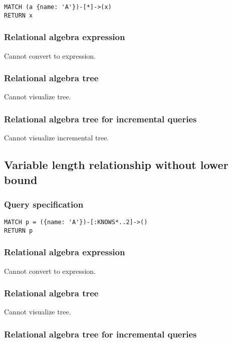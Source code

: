 \begin{lstlisting}
MATCH (a {name: 'A'})-[*]->(x)
RETURN x
\end{lstlisting}

\subsubsection*{Relational algebra expression}

Cannot convert to expression.

\subsubsection*{Relational algebra tree}

Cannot visualize tree.

\subsubsection*{Relational algebra tree for incremental queries}

Cannot visualize incremental tree.

\subsection{Variable length relationship without lower bound}

\subsubsection*{Query specification}

\begin{lstlisting}
MATCH p = ({name: 'A'})-[:KNOWS*..2]->()
RETURN p
\end{lstlisting}

\subsubsection*{Relational algebra expression}

Cannot convert to expression.

\subsubsection*{Relational algebra tree}

Cannot visualize tree.

\subsubsection*{Relational algebra tree for incremental queries}

